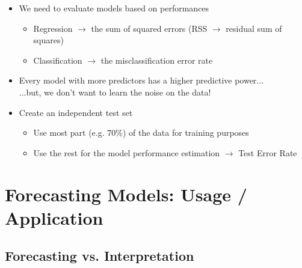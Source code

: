 \documentclass[a4paper]{article}
\begin{document}
			\begin{itemize}
				\item We need to evaluate models based on performances
					\begin{itemize}
						\item Regression $\rightarrow$ the sum of squared errors (RSS $\rightarrow$ residual sum of squares)
						\item Classification $\rightarrow$ the misclassification error rate
					\end{itemize}
				\item Every model with more predictors has a higher predictive power... \\
					...but, we don't want to learn the noise on the data!
				\item Create an independent test set
					\begin{itemize}
						\item Use most part (e.g. 70\%) of the data for training purposes
						\item Use the rest for the model performance estimation $\rightarrow$ Test Error Rate
					\end{itemize}
			\end{itemize}
		
			\newpage
				
	\section{Forecasting Models: Usage / Application}
	
		\subsection{Forecasting vs. Interpretation}
		
\end{document}
